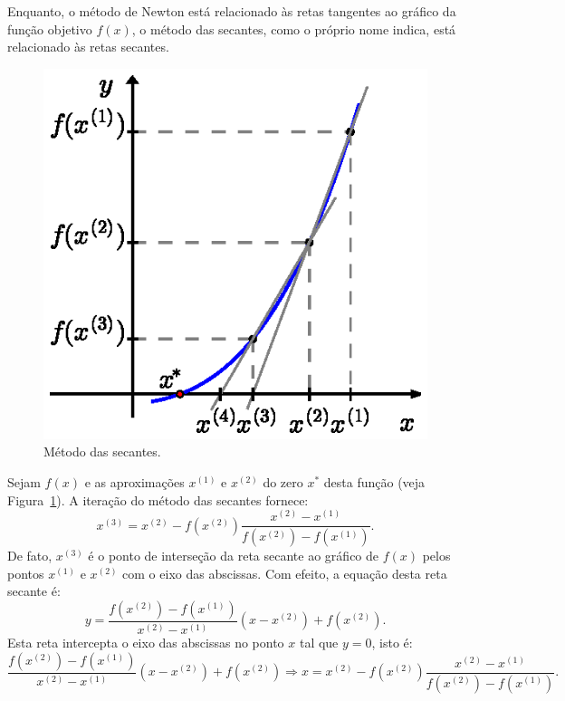 Enquanto, o método de Newton está relacionado às retas tangentes ao gráfico da função objetivo $f(x)$, o método das secantes, como o próprio nome indica, está relacionado às retas secantes.

\begin{figure}[h]
  \centering
  \includegraphics{./cap_equacao1d/pics/metodo_das_secantes/metodo_das_secantes.eps}
  \caption{Método das secantes.}
  \label{fig:metodo_das_secantes}
\end{figure}

Sejam $f(x)$ e as aproximações $x^{(1)}$ e $x^{(2)}$ do zero $x^*$ desta função (veja Figura~\ref{fig:metodo_das_secantes}). A iteração do método das secantes fornece:
\begin{equation}
  x^{(3)} = x^{(2)} - f(x^{(2)})\frac{x^{(2)} - x^{(1)}}{f(x^{(2)}) - f(x^{(1)})}.
\end{equation}
De fato, $x^{(3)}$ é o ponto de interseção da reta secante ao gráfico de $f(x)$ pelos pontos $x^{(1)}$ e $x^{(2)}$ com o eixo das abscissas. Com efeito, a equação desta reta secante é:
\begin{equation}
  y = \frac{f(x^{(2)}) - f(x^{(1)})}{x^{(2)} - x^{(1)}}(x - x^{(2)}) + f(x^{(2)}).
\end{equation}
Esta reta intercepta o eixo das abscissas no ponto $x$ tal que $y=0$, isto é:
\begin{equation}
  \frac{f(x^{(2)}) - f(x^{(1)})}{x^{(2)} - x^{(1)}}(x - x^{(2)}) + f(x^{(2)}) \Rightarrow x = x^{(2)} - f(x^{(2)})\frac{x^{(2)} - x^{(1)}}{f(x^{(2)}) - f(x^{(1)})}.
\end{equation}


